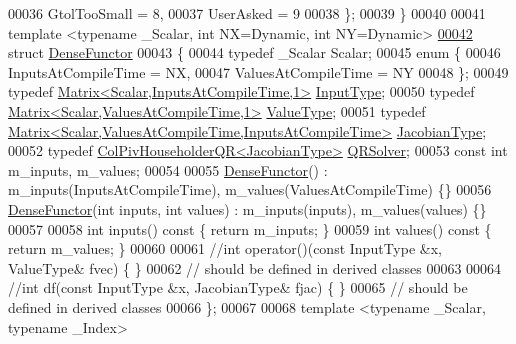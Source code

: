 \begin{DoxyCode}
00036         GtolTooSmall = 8,
00037         UserAsked = 9
00038     \};
00039 \}
00040 
00041 \textcolor{keyword}{template} <\textcolor{keyword}{typename} \_Scalar, \textcolor{keywordtype}{int} NX=Dynamic, \textcolor{keywordtype}{int} NY=Dynamic>
\hyperlink{struct_eigen_1_1_dense_functor}{00042} \textcolor{keyword}{struct }\hyperlink{struct_eigen_1_1_dense_functor}{DenseFunctor}
00043 \{
00044   \textcolor{keyword}{typedef} \_Scalar Scalar;
00045   \textcolor{keyword}{enum} \{
00046     InputsAtCompileTime = NX,
00047     ValuesAtCompileTime = NY
00048   \};
00049   \textcolor{keyword}{typedef} \hyperlink{group___core___module_class_eigen_1_1_matrix}{Matrix<Scalar,InputsAtCompileTime,1>} 
      \hyperlink{group___core___module_class_eigen_1_1_matrix}{InputType};
00050   \textcolor{keyword}{typedef} \hyperlink{group___core___module_class_eigen_1_1_matrix}{Matrix<Scalar,ValuesAtCompileTime,1>} 
      \hyperlink{group___core___module_class_eigen_1_1_matrix}{ValueType};
00051   \textcolor{keyword}{typedef} \hyperlink{group___core___module_class_eigen_1_1_matrix}{Matrix<Scalar,ValuesAtCompileTime,InputsAtCompileTime>}
       \hyperlink{group___core___module_class_eigen_1_1_matrix}{JacobianType};
00052   \textcolor{keyword}{typedef} \hyperlink{group___q_r___module_class_eigen_1_1_col_piv_householder_q_r}{ColPivHouseholderQR<JacobianType>} 
      \hyperlink{group___q_r___module_class_eigen_1_1_col_piv_householder_q_r}{QRSolver};
00053   \textcolor{keyword}{const} \textcolor{keywordtype}{int} m\_inputs, m\_values;
00054 
00055   \hyperlink{struct_eigen_1_1_dense_functor}{DenseFunctor}() : m\_inputs(InputsAtCompileTime), m\_values(ValuesAtCompileTime) \{\}
00056   \hyperlink{struct_eigen_1_1_dense_functor}{DenseFunctor}(\textcolor{keywordtype}{int} inputs, \textcolor{keywordtype}{int} values) : m\_inputs(inputs), m\_values(values) \{\}
00057 
00058   \textcolor{keywordtype}{int} inputs()\textcolor{keyword}{ const }\{ \textcolor{keywordflow}{return} m\_inputs; \}
00059   \textcolor{keywordtype}{int} values()\textcolor{keyword}{ const }\{ \textcolor{keywordflow}{return} m\_values; \}
00060 
00061   \textcolor{comment}{//int operator()(const InputType &x, ValueType& fvec) \{ \}}
00062   \textcolor{comment}{// should be defined in derived classes}
00063   
00064   \textcolor{comment}{//int df(const InputType &x, JacobianType& fjac) \{ \}}
00065   \textcolor{comment}{// should be defined in derived classes}
00066 \};
00067 
00068 \textcolor{keyword}{template} <\textcolor{keyword}{typename} \_Scalar, \textcolor{keyword}{typename} \_Index>

\end{DoxyCode}

